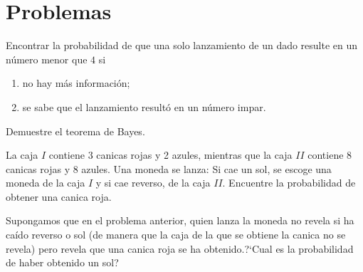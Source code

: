\section*{Problemas}

\begin{problema}
	\label{exmp:1.13}
	Encontrar la probabilidad de que una solo lanzamiento de un dado resulte en un número menor que $4$ si
	\begin{enumerate}
		\item no hay más información; 
		\item se sabe que el lanzamiento resultó en un número impar.
	\end{enumerate}
	
\end{problema}

\begin{problema}
	\label{solved:1.16}
	Demuestre el teorema de Bayes.
\end{problema}


\begin{problema}
	\label{solved:1.15}
	La caja $I$ contiene 3 canicas rojas y 2 azules, mientras que la caja $II$ contiene $8$ canicas rojas y 8 azules. Una moneda se lanza: Si cae un sol, se escoge una moneda de la caja $I$ y si cae reverso, de la caja $II.$ Encuentre la probabilidad de obtener una canica roja.
\end{problema}


{}
\begin{problema}
	\label{solved:17}
	Supongamos que en el problema anterior, quien lanza la moneda no revela si ha caído reverso o sol (de manera que la caja de la que se obtiene la canica no se revela) pero revela que una canica roja se ha obtenido.?`Cual es la probabilidad de haber obtenido un sol?
\end{problema}